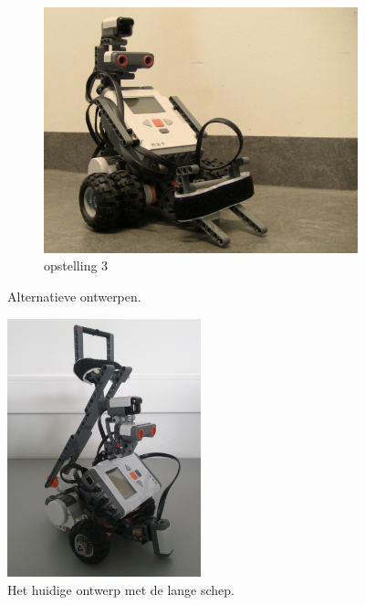 \documentclass[eind]{penoverslag}
\begin{document}
\begin{figure}
\begin{subfigure}[h]{0.325\textwidth}
		\centering
		\includegraphics[width=\textwidth]{robotOud3}
		\caption{opstelling 3}
		\label{fig:robotOud3}
	\end{subfigure}
\caption{Alternatieve ontwerpen.}
\label{fig:robotOud}
\end{figure}

\begin{figure}
\centering
	\includegraphics[width=0.5\textwidth]{robotNieuw}
\caption{Het huidige ontwerp met de lange schep.}
\label{fig:robotBouw}
\end{figure}
\end{document}
